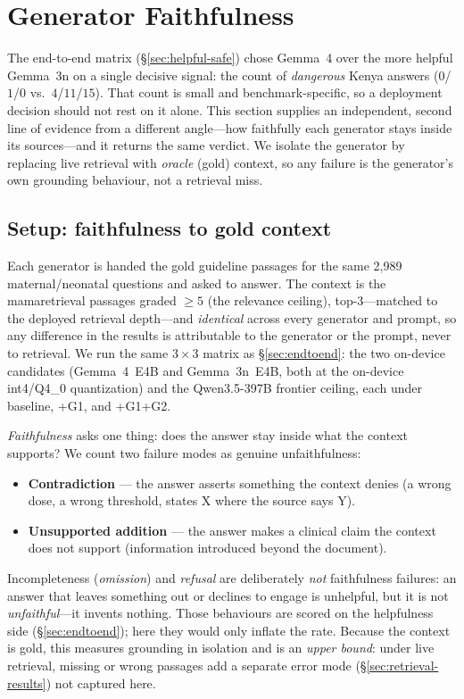 \section{Generator Faithfulness}
\label{sec:generator}

The end-to-end matrix (\S\ref{sec:helpful-safe}) chose Gemma~4 over the more
helpful Gemma~3n on a single decisive signal: the count of \emph{dangerous}
Kenya answers ($0$/$1$/$0$ vs.\ $4$/$11$/$15$). That count is small and
benchmark-specific, so a deployment decision should not rest on it alone. This
section supplies an independent, second line of evidence from a different
angle---how faithfully each generator stays inside its sources---and it
returns the same verdict. We isolate the generator by replacing live retrieval
with \emph{oracle} (gold) context, so any failure is the generator's own
grounding behaviour, not a retrieval miss.

\subsection{Setup: faithfulness to gold context}
\label{sec:faith-setup}

Each generator is handed the gold guideline passages for the same 2{,}989
maternal/neonatal questions and asked to answer. The context is the
mamaretrieval passages graded $\geq 5$ (the relevance ceiling),
top-3---matched to the deployed retrieval depth---and \emph{identical} across
every generator and prompt, so any difference in the results is attributable
to the generator or the prompt, never to retrieval. We run the same
$3\times3$ matrix as \S\ref{sec:endtoend}: the two on-device candidates
(Gemma~4~E4B and Gemma~3n~E4B, both at the on-device int4/Q4\_0 quantization)
and the Qwen3.5-397B frontier ceiling, each under baseline, \mbox{+G1}, and
\mbox{+G1+G2}.

\emph{Faithfulness} asks one thing: does the answer stay inside what the
context supports? We count two failure modes as genuine unfaithfulness:
\begin{itemize}\setlength{\itemsep}{1pt}
  \item \textbf{Contradiction} --- the answer asserts something the context
  denies (a wrong dose, a wrong threshold, states X where the source says Y).
  \item \textbf{Unsupported addition} --- the answer makes a clinical claim
  the context does not support (information introduced beyond the document).
\end{itemize}
Incompleteness (\emph{omission}) and \emph{refusal} are deliberately
\emph{not} faithfulness failures: an answer that leaves something out or
declines to engage is unhelpful, but it is not \emph{unfaithful}---it invents
nothing. Those behaviours are scored on the helpfulness side
(\S\ref{sec:endtoend}); here they would only inflate the rate. Because the
context is gold, this measures grounding in isolation and is an \emph{upper
bound}: under live retrieval, missing or wrong passages add a separate error
mode (\S\ref{sec:retrieval-results}) not captured here.

